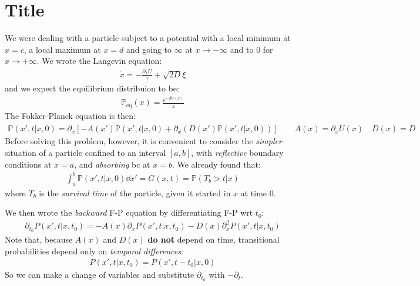 \documentclass[../template.tex]{subfiles}
\begin{document}
\section{Title}

We were dealing with a particle subject to a potential with a local minimum at $x=c$, a local maximum at $x=d$ and going to $\infty$ at $x \to -\infty$ and to $0$ for $x \to +\infty$. We wrote the Langevin equation:
\begin{align*}
    \dot{x} = -\frac{\partial_x U}{\gamma}  + \sqrt{2D} \xi
\end{align*}      
and we expect the equilibrium distribuion to be:
\begin{align*}
    \mathbb{P}_{\mathrm{eq} }(x) = \frac{e^{-\beta U(x)}}{z} 
\end{align*}
The Fokker-Planck equation is then:
\begin{align*}
    \dot{\mathbb{P}}(x',t|x,0) = \partial_x [-A(x') \mathbb{P}(x',t|x,0) + \partial_x (D(x') \mathbb{P}(x',t|x,0))] \qquad A(x) = \partial_x U(x) \quad D(x) = D
\end{align*}
Before solving this problem, however, it is convenient to consider the \textit{simpler} situation of a particle confined to an interval $[a,b]$, with \textit{reflective} boundary conditions at $x=a$, and \textit{absorbing} bc at $x=b$. We already found that:
\begin{align}
    \int_a^b \mathbb{P}(x',t|x, 0) \dd{x'} = G(x,t) = \mathbb{P}(T_b > t|x)
    \label{eqn:Gt}
\end{align}    
where $T_b$ is the \textit{survival time} of the particle, given it started in $x$ at time $0$.      

We then wrote the \textit{backward} F-P equation by differentiating F-P wrt $t_0$:
\begin{align*}
    \partial_{t_0} P(x',t|x,t_0) = -A(x) \partial_x P(x',t|x,t_0) - D(x)\partial_x^2 P(x',t|x,t_0)
\end{align*}  
Note that, because $A(x)$ and $D(x)$ \textbf{do not} depend on time, transitional probabilities depend only on \textit{temporal differences}:    
\begin{align*}
    P(x',t|x,t_0) = P(x',t-t_0|x,0)
\end{align*}
So we can make a change of variables and substitute $\partial_{t_0}$ with $-\partial_t$.   
\end{document}
